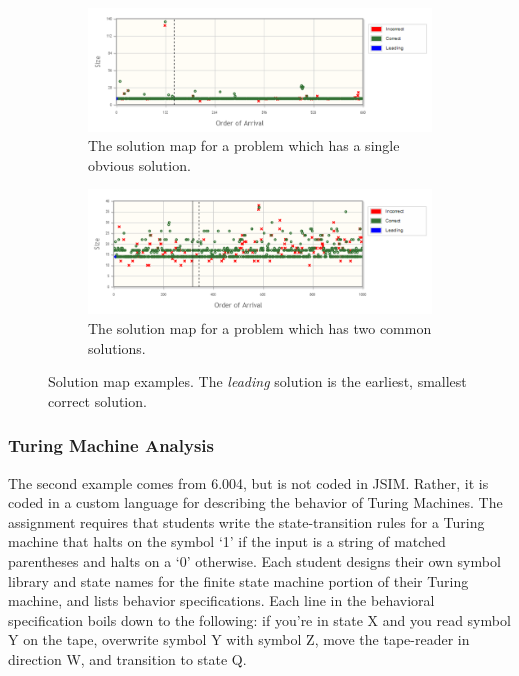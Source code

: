 \documentclass[12pt]{article}
\begin{document}
\begin{figure}[p]
\centering
\begin{subfigure}[b]{1.0\textwidth}
	\centering
\includegraphics[scale=0.65]{nedfig1.png}
\caption{The solution map for a problem which has a single obvious solution.}
\label{nedfig1}
\end{subfigure}
\begin{subfigure}[b]{1.0\textwidth}
	\centering
\includegraphics[scale=0.65]{nedfig2.png}
\caption{The solution map for a problem which has two common solutions.}
\label{nedfig2}
\end{subfigure}
\label{nedfigsAll}
\caption{Solution map examples. The \textit{leading} solution is the earliest, smallest correct solution.}
\end{figure}

\subsubsection{Turing Machine Analysis}

The second example comes from 6.004, but is not coded in JSIM. Rather, it is coded in a custom language for describing the behavior of Turing Machines. The assignment requires that students write the state-transition rules for a Turing machine that halts on the symbol `1' if the input is a string of matched parentheses and halts on a `0' otherwise. Each student designs their own symbol library and state names for the finite state machine portion of their Turing machine, and lists behavior specifications. Each line in the behavioral specification boils down to the following: if you're in state X and you read symbol Y on the tape, overwrite symbol Y with symbol Z, move the tape-reader in direction W, and transition to state Q.
\end{document}
